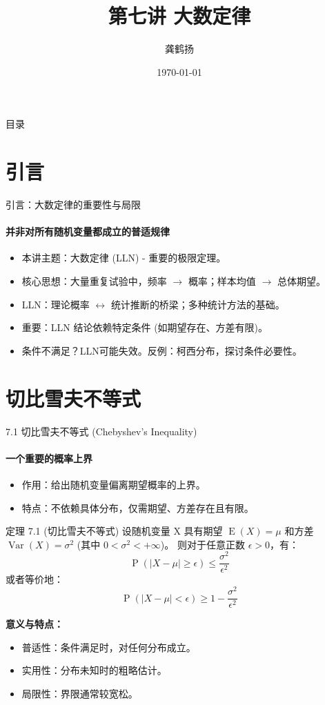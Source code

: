 \documentclass[UTF8]{beamer}
\title{第七讲 大数定律}
\author{龚鹤扬}
\institute{中国科学技术大学统计学博士 \\ 上海芯梯科技有限公司} %
\date{\today}
\DeclareMathOperator{\E}{\operatorname{E}}
\DeclareMathOperator{\Var}{\operatorname{Var}}
\DeclareMathOperator{\Prob}{\operatorname{P}}
\begin{document}
\begin{frame}
    \titlepage
\end{frame}

\begin{frame}{目录}
    \tableofcontents
\end{frame}

\section{引言}
\begin{frame}{引言：大数定律的重要性与局限}
    \framesubtitle{并非对所有随机变量都成立的普适规律}
    \begin{itemize}
        \item 本讲主题：\alert{大数定律 (LLN)} - 重要的极限定理。
        \item 核心思想：大量重复试验中，\alert{频率} $\to$ \alert{概率}；样本均值 $\to$ 总体\alert{期望}。
        \item LLN：\alert{理论概率} $\leftrightarrow$ \alert{统计推断}的桥梁；多种统计方法的基础。
        \item \alert{重要}：LLN 结论依赖特定\alert{条件} (如期望存在、方差有限)。
        \item 条件不满足？LLN可能失效。反例：\alert{柯西分布}，探讨条件必要性。
    \end{itemize}
\end{frame}

\section{切比雪夫不等式}
\begin{frame}[shrink=5]{7.1 切比雪夫不等式 (Chebyshev's Inequality)}
    \framesubtitle{一个重要的概率上界}
    \begin{itemize}
        \item 作用：给出随机变量偏离期望概率的\alert{上界}。
        \item 特点：不依赖具体分布，仅需\alert{期望、方差}存在且有限。
    \end{itemize}
    \pause
    \begin{block}{定理 7.1 (切比雪夫不等式)}
        设随机变量 X 具有期望 $\E(X) = \mu$ 和方差 $\Var(X) = \sigma^2$ (其中 $0 < \sigma^2 < +\infty$)。
        则对于任意正数 $\epsilon > 0$，有：
        \[ \Prob(|X - \mu| \geq \epsilon) \leq \frac{\sigma^2}{\epsilon^2} \]
        或者等价地：
        \[ \Prob(|X - \mu| < \epsilon) \geq 1 - \frac{\sigma^2}{\epsilon^2} \]
    \end{block}
    \pause
    \textbf{意义与特点：}
    \begin{itemize}
        \item \alert{普适性}：条件满足时，对任何分布成立。
        \item \alert{实用性}：分布未知时的粗略估计。
        \item \alert{局限性}：界限通常较宽松。
    \end{itemize}
\end{frame}
\end{document}
